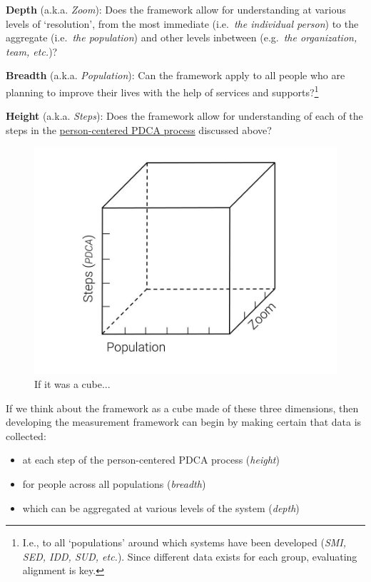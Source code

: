 \documentclass[
]{book}
\providecommand{\tightlist}{%
  \setlength{\itemsep}{0pt}\setlength{\parskip}{0pt}}
\begin{document}
\textbf{Depth} (a.k.a. \emph{Zoom}): Does the framework allow for understanding at various levels of `resolution', from the most immediate (i.e.~\emph{the individual person}) to the aggregate (i.e.~\emph{the population}) and other levels inbetween (e.g.~\emph{the organization, team, etc.})?

\textbf{Breadth} (a.k.a. \emph{Population}): Can the framework apply to all people who are planning to improve their lives with the help of services and supports?\footnote{I.e., to all `populations' around which systems have been developed (\emph{SMI, SED, IDD, SUD, etc.}). Since different data exists for each group, evaluating alignment is key.}

\textbf{Height} (a.k.a. \emph{Steps}): Does the framework allow for understanding of each of the steps in the \protect\hyperlink{pcpdca}{person-centered PDCA process} discussed above?

\begin{figure}
\includegraphics[width=24in]{_bookdown_files/img/QoL Framework Cube} \caption{If it was a cube...}\label{fig:unnamed-chunk-15}
\end{figure}

If we think about the framework as a cube made of these three dimensions, then developing the measurement framework can begin by making certain that data is collected:

\begin{itemize}
\tightlist
\item
  at each step of the person-centered PDCA process (\emph{height})
\item
  for people across all populations (\emph{breadth})
\item
  which can be aggregated at various levels of the system (\emph{depth})
\end{itemize}
\end{document}
